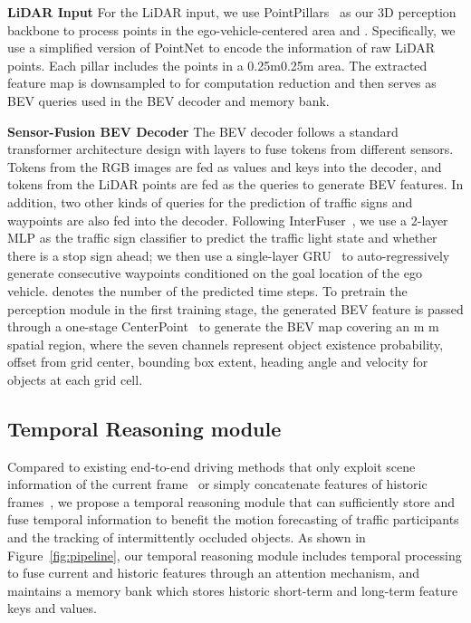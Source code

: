 \documentclass[10pt,twocolumn,letterpaper]{article}
\begin{document}
\noindent\textbf{LiDAR Input} For the LiDAR input, we use  PointPillars~\cite{lang2019pointpillars} as our 3D perception backbone to process points in the ego-vehicle-centered area  and . Specifically, we use a simplified version of PointNet\cite{qi2018frustum} to encode the information of raw LiDAR points. Each pillar includes the points in a 0.25m0.25m area. The extracted feature map is downsampled to  for computation reduction and then serves as BEV queries used in the BEV decoder and memory bank.

\noindent\textbf{Sensor-Fusion BEV Decoder} The BEV decoder follows a standard transformer architecture design with  layers to fuse tokens from different sensors.
Tokens from the RGB images are fed as values and keys into the decoder, and tokens from the LiDAR points are fed as the  queries to generate BEV features. In addition, two other kinds of queries for the prediction of traffic signs and waypoints  are also fed into the decoder. Following InterFuser~\cite{shao2022safety}, we use a 2-layer MLP as the traffic sign classifier to predict the traffic light state and whether there is a stop sign ahead; we then use a single-layer GRU~\cite{cho2014learning} to auto-regressively generate consecutive waypoints  conditioned on the goal location of the ego vehicle.  denotes the number of the predicted time steps. To pretrain the perception module in the first training stage, the generated BEV feature is passed through a one-stage CenterPoint~\cite{yin2021center} to generate the  BEV map covering an m  m spatial region, where the seven channels represent object existence probability, offset from grid center, bounding box extent, heading angle and velocity for objects at each grid cell. 



\subsection{Temporal Reasoning module}
\label{sec:temporal reasoning}

Compared to existing end-to-end driving methods that only exploit scene information of the current frame~\cite{chitta2022transfuser,chen2022learning} or simply concatenate features of historic frames~\cite{toromanoff2020end}, we propose a temporal reasoning module that can sufficiently store and fuse temporal information to benefit the motion forecasting of traffic participants and the tracking of intermittently occluded objects. As shown in Figure~\ref{fig:pipeline}, our temporal reasoning module includes temporal processing to fuse current and historic features through an attention mechanism, and maintains a memory bank which stores historic short-term and long-term feature keys and values.
\end{document}
